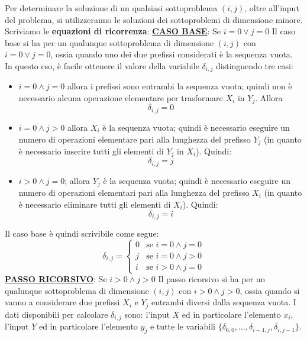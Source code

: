 \documentclass[12pt]{article}
\begin{document}
Per determinare la soluzione di un qualsiasi sottoproblema $(i,j)$, oltre all'input del problema, si utilizzeranno le soluzioni dei sottoproblemi di dimensione minore.
Scriviamo le \textbf{equazioni di ricorrenza}: \newline
\textbf{\underline{CASO BASE}}: Se $i = 0 \vee j = 0$ \newline
Il caso base si ha per un qualunque sottoproblema di dimensione $(i,j)$ con $i = 0 \vee j = 0$, ossia quando uno dei due prefissi considerati è la sequenza vuota.
In questo cso, è facile ottenere il valore della variabile $\delta_{i,j}$ distinguendo tre casi:
\begin{itemize}
    \item $i = 0 \land j = 0$ allora i prefissi sono entrambi la sequenza vuota; quindi non è necessario alcuna operazione elementare per trasformare $X_i$ in $Y_j$.
    Allora 
    $$\delta_{i,j} = 0$$
    \item $i = 0 \land j > 0$ allora $X_i$ è la sequenza vuota; quindi è necessario eseguire un numero di operazioni elementare pari alla lunghezza del prefisso $Y_j$ (in quanto è necessario inserire tutti gli elementi di $Y_j$ in $X_i$).
    Quindi:
    $$\delta_{i,j} = j$$
    \item $i > 0 \land j = 0$; allora $Y_j$ è la sequenza vuota; quindi è necessario eseguire un numero di operazioni elementari pari alla lunghezza del prefisso $X_i$ (in quanto è necessario eliminare tutti gli elementi di $X_i$). Quindi:
    $$\delta_{i,j} = i$$
\end{itemize}
Il caso base è quindi scrivibile come segue:
\begin{equation*}
    \delta_{i,j} = \begin{cases}
        0 & \textrm{se } i = 0 \land j = 0 \\
        j & \textrm{se } i = 0 \land j > 0 \\
        i & \textrm{se } i > 0 \land j = 0
    \end{cases}
\end{equation*}
\textbf{\underline{PASSO RICORSIVO}}: Se $i > 0 \land j > 0$ \newline
Il passo ricorsivo si ha per un qualunque sottoproblema di dimensione $(i,j)$ con $i > 0 \land j > 0$, ossia quando si vanno a considerare due prefissi
$X_i$ e $Y_j$ entrambi diversi dalla sequenza vuota. I dati disponibili per calcolare $\delta_{i,j}$ sono: l'input $X$ ed in particolare l'elemento $x_i$, l'input $Y$ ed in particolare l'elemento $y_j$ e tutte le variabili $\{\delta_{0,0},\dots, \delta_{i-1, j}, \delta_{i, j-1}\}$.
\end{document}
